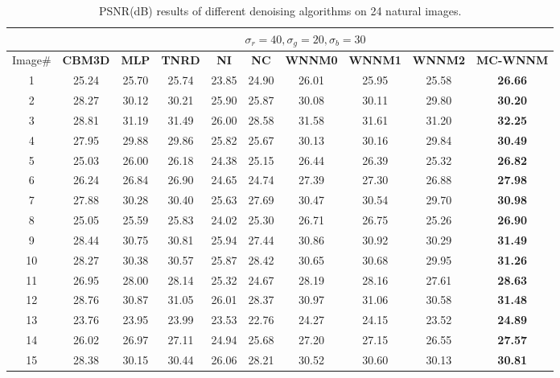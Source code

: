 \documentclass[10pt,twocolumn,letterpaper,sort&compress]{article}
\begin{document}
\begin{table}
\caption{PSNR(dB) results of different denoising algorithms on 24 natural images.}
\label{taba}
\begin{center}
\renewcommand\arraystretch{1.0}
\scriptsize
\begin{tabular}{|c||c|c|c|c|c|c|c|c|c|}
\hline
&\multicolumn{9}{c|}{ $\sigma_{r} = 40, \sigma_{g} = 20, \sigma_{b} = 30$}
\\
\hline
\hline
Image\#
&
\textbf{CBM3D}
&
\textbf{MLP}
&
\textbf{TNRD}
&
\textbf{NI}
&
\textbf{NC}
&
\textbf{WNNM0}
&
\textbf{WNNM1}
&
\textbf{WNNM2}
&
\textbf{MC-WNNM}
\\
\hline
1& 25.24 & 25.70 & 25.74 & 23.85 & 24.90 & 26.01 & 25.95 & 25.58 & \textbf{26.66}
\\
\hline
2& 28.27 & 30.12 & 30.21 & 25.90 & 25.87 & 30.08 & 30.11 & 29.80 & \textbf{30.20} 
\\
\hline
3 & 28.81 & 31.19 & 31.49 & 26.00 & 28.58 & 31.58 & 31.61 & 31.20 & \textbf{32.25}  
\\
\hline 
4 & 27.95 & 29.88 & 29.86 & 25.82 & 25.67 & 30.13 & 30.16 & 29.84 & \textbf{30.49} 
\\
\hline
5 & 25.03 & 26.00 & 26.18 & 24.38 & 25.15 & 26.44 & 26.39 & 25.32 & \textbf{26.82}
\\
\hline
6 & 26.24 & 26.84 & 26.90 & 24.65 & 24.74 & 27.39 & 27.30 & 26.88 & \textbf{27.98} 
\\
\hline
7 & 27.88 & 30.28 & 30.40 & 25.63 & 27.69 & 30.47 & 30.54 & 29.70 & \textbf{30.98} 
\\
\hline
8 & 25.05 & 25.59 & 25.83 & 24.02 & 25.30 & 26.71 & 26.75 & 25.26 & \textbf{26.90}
\\
\hline
9 & 28.44 & 30.75 & 30.81 & 25.94 & 27.44 & 30.86 & 30.92 & 30.29 & \textbf{31.49}
\\
\hline
10 & 28.27 & 30.38 & 30.57 & 25.87 & 28.42 & 30.65 & 30.68 & 29.95 & \textbf{31.26}
\\
\hline
11 & 26.95 & 28.00 & 28.14 & 25.32 & 24.67 & 28.19 & 28.16 & 27.61 & \textbf{28.63}
\\
\hline
12 & 28.76 & 30.87 & 31.05 & 26.01 & 28.37 & 30.97 & 31.06 & 30.58 & \textbf{31.48}
\\
\hline
13 & 23.76 & 23.95 & 23.99 & 23.53 & 22.76 & 24.27 & 24.15 & 23.52 & \textbf{24.89}
\\
\hline
14 & 26.02 & 26.97 & 27.11 & 24.94  & 25.68 & 27.20 & 27.15 & 26.55 & \textbf{27.57}
\\
\hline
15 & 28.38 & 30.15 & 30.44 & 26.06 & 28.21 & 30.52 & 30.60 & 30.13 & \textbf{30.81}

\end{tabular}
\end{center}
\end{table}
\end{document}
